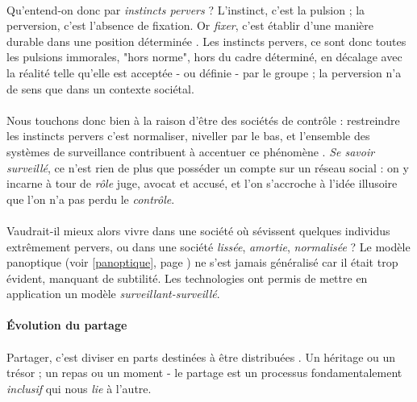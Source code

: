 \paragraph{} Qu'entend-on donc par \emph{instincts pervers} ? L'instinct, c'est la pulsion ; la perversion, c'est l'absence
de fixation. Or \emph{fixer}, c'est \guillemotleft établir d'une manière durable dans une position déterminée \guillemotright \cite{Fixe0}.
Les instincts pervers, ce sont donc toutes les pulsions immorales, "hors norme", hors du cadre déterminé, en décalage avec la réalité
telle qu'elle est acceptée - ou définie - par le groupe ; la perversion n'a de sens que dans un contexte sociétal.

\paragraph{} Nous touchons donc bien à la raison d'être des sociétés de contrôle : restreindre les instincts pervers c'est
normaliser, niveller par le bas, et l'ensemble des systèmes de surveillance contribuent à accentuer ce phénomène \cite{SocialMedia0}.
\emph{Se savoir surveillé}, ce n'est rien de plus que posséder un compte sur un réseau social : on y incarne à tour de
\emph{rôle} juge, avocat et accusé, et l'on s'accroche à l'idée illusoire que l'on n'a pas perdu le \emph{contrôle}.

\paragraph{} Vaudrait-il mieux alors vivre dans une société où sévissent quelques individus extrêmement pervers, ou dans
une société \emph{lissée}, \emph{amortie}, \emph{normalisée} ? Le modèle panoptique (voir \ref{panoptique}, page \pageref{panoptique})
ne s'est jamais généralisé car il était trop évident, manquant de subtilité. Les technologies ont permis de mettre en application
un modèle \emph{surveillant-surveillé}.


\paragraph{Évolution du partage}

\paragraph{} Partager, c'est \guillemotleft diviser en parts destinées à être distribuées \guillemotright \cite{Partage0}.
Un héritage ou un trésor ; un repas ou un moment - le partage est un processus fondamentalement \emph{inclusif} qui nous
\emph{lie} à l'autre.

